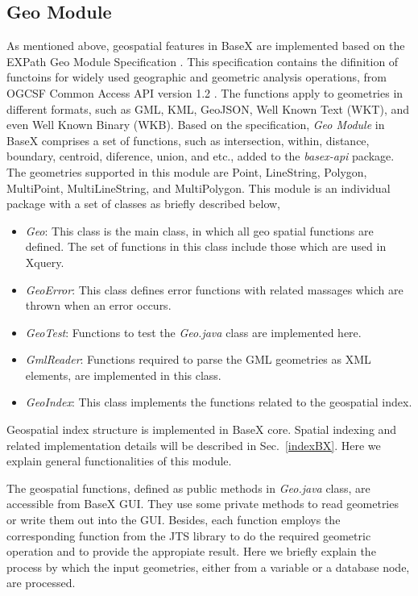 \documentclass[a4paper,12pt]{article}
\begin{document}
\subsection{Geo Module}
As mentioned above, geospatial features in BaseX are implemented based on the EXPath Geo Module Specification \cite{expath}. This specification contains the difinition of functoins for widely used geographic and geometric analysis operations, from OGCSF Common Access API version 1.2 \cite{simpleFeature}. The functions apply to geometries in different formats, such as GML, KML, GeoJSON, Well Known Text (WKT), and even Well Known Binary (WKB). Based on the specification, \textit{Geo Module} in BaseX comprises a set of functions, such as intersection, within, distance, boundary, centroid, diference, union, and etc., added to the \textit{basex-api} package. The geometries supported in this module are Point, LineString, Polygon, MultiPoint, MultiLineString, and MultiPolygon. This module is an individual package with a set of classes as briefly described below,
\begin{itemize}
\item \textit{Geo}: This class is the main class, in which all geo spatial functions are defined. The set of functions in this class include those which are used in Xquery.
\item \textit{GeoError}: This class defines error functions with related massages which are thrown when an error occurs.
\item \textit{GeoTest}: Functions to test the \textit{Geo.java} class are implemented here.
\item \textit{GmlReader}: Functions required to parse the GML geometries as XML elements, are implemented in this class.
\item \textit{GeoIndex}: This class implements the functions related to the geospatial index. 
\end{itemize}

Geospatial index structure is implemented in BaseX core. Spatial indexing and related implementation details will be described in Sec.~\ref{indexBX}. Here we explain general functionalities of this module.

The geospatial functions, defined as public methods in \textit{Geo.java} class, are accessible from BaseX GUI. They use some private methods to read geometries or write them out into the GUI. Besides, each function employs the corresponding function from the JTS library to do the required geometric operation and to provide the appropiate result. Here we briefly explain the process by which the input geometries, either from a variable or a database node, are processed.
\end{document}
